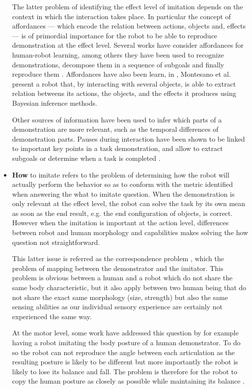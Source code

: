 \begin{itemize}
The latter problem of identifying the effect level of imitation depends on the context in which the interaction takes place. In particular the concept of affordances \cite{gibson1986ecological} --- which encode the relation between actions, objects and, effects --- is of primordial importance for the robot to be able to reproduce demonstration at the effect level. Several works have consider affordances for human-robot learning, among others they have been used to recognize demonstrations, decompose them in a sequence of subgoals and finally reproduce them \cite{macl07affimit}. Affordances have also been learn, in \cite{montesano2008learning}, Montesano et al. present a robot that, by interacting with several objects, is able to extract relation betweens its actions, the objects, and the effects it produces using Bayesian inference methods. 

Other sources of information have been used to infer which parts of a demonstration are more relevant, such as the temporal differences of demonstration parts. Pauses during interaction have been shown to be linked to important key points in a task demonstration, and allow to extract subgoals or determine when a task is completed \cite{theofilis2013temporal}.

\item \textbf{How} to imitate refers to the problem of determining how the robot will actually perform the behavior so as to conform with the metric identified when answering the what to imitate question. When the demonstration is only relevant at the effect level, the robot can solve the task by its own mean as soon as the end result, e.g. the end configuration of objects, is correct. However when the imitation is important at the action level, differences between robot and human morphology and capabilities makes solving the how question not straightforward.

This latter issue is referred as the correspondence problem \cite{nehaniv2002correspondence}, which the problem of mapping between the demonstrator and the imitator. This problem is obvious between a human and a robot which do not share the same body characteristic, but it also apply between two human being that do not share the exact same morphology (size, strength) but also the same sensing abilities as our individual sensory experience are certainly not experienced the same way.

At the motor level, some work have addressed this question by for example having a robot imitating the body posture of a human demonstrator. To do so the robot can not reproduce the angle between each articulation as the resulting posture is likely to be different but more importantly the robot is likely to lose its balance and fall. The problem is therefore for the robot to copy the human posture as closely as possible while maintaining its balance \cite{hyon2007full,yamane2009simultaneous}. 


\end{itemize}

